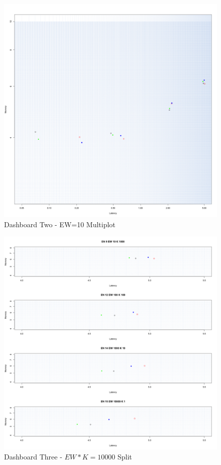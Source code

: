 \begin{figure}[h!tbp]
	\centering
	\includegraphics[width=0.90\linewidth]{images/dashboard-2}	
	\caption[\textsc{Analyser} Investigation Stack - Level 0 - Dashboard Two - Multiplot Version]{Dashboard Two - EW=10 Multiplot} 
	\label{fig:result_dashboard_ewb}
\end{figure}
\begin{figure}[htbp]
	\centering
	\includegraphics[width=0.90\linewidth]{images/dashboard-3-split}	
	\caption[\textsc{Analyser} Investigation Stack - Level 0 - Dashboard Three - Split Version]{Dashboard Three - $EW*K=10000$ Split} 
	\label{fig:result_dashboard_proba}
\end{figure}

